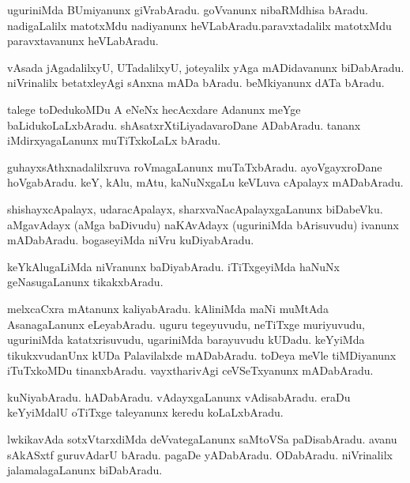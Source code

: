 \documentclass{article}
\begin{document}
\begin{mn}
uguriniMda BUmiyanunx giVrabAradu. goVvanunx nibaRMdhisa bAradu. nadigaLalilx matotxMdu 
nadiyanunx heVLabAradu.paravxtadalilx  matotxMdu paravxtavanunx heVLabAradu.
\end{mn}

\begin{mn}
vAsada jAgadalilxyU, UTadalilxyU, joteyalilx yAga mADidavanunx biDabAradu. niVrinalilx 
betatxleyAgi sAnxna mADa bAradu. beMkiyanunx dATa bAradu.
\end{mn}

\begin{mn}
talege toDedukoMDu A eNeNx hecAcxdare Adanunx meYge baLidukoLaLxbAradu. shAsatxrXtiLiyadavaroDane 
ADabAradu. tananx iMdirxyagaLanunx muTiTxkoLaLx bAradu.
\end{mn}

\begin{mn}
guhayxsAthxnadalilxruva roVmagaLanunx muTaTxbAradu. ayoVgayxroDane hoVgabAradu. keY, kAlu, mAtu, 
kaNuNxgaLu keVLuva cApalayx mADabAradu.
\end{mn}

\begin{mn}
shishayxcApalayx, udaracApalayx, sharxvaNacApalayxgaLanunx biDabeVku. aMgavAdayx (aMga baDivudu)
naKAvAdayx (uguriniMda bArisuvudu) ivanunx mADabAradu. bogaseyiMda niVru kuDiyabAradu.
\end{mn}

\begin{mn}
keYkAlugaLiMda niVranunx baDiyabAradu. iTiTxgeyiMda haNuNx geNasugaLanunx tikakxbAradu.
\end{mn}

\begin{mn}
melxcaCxra mAtanunx kaliyabAradu. kAliniMda maNi muMtAda AsanagaLanunx eLeyabAradu. uguru 
tegeyuvudu, neTiTxge muriyuvudu, uguriniMda katatxrisuvudu, ugariniMda barayuvudu kUDadu.
keYyiMda tikukxvudanUnx kUDa Palavilalxde mADabAradu. toDeya meVle tiMDiyanunx iTuTxkoMDu 
tinanxbAradu. vayxtharivAgi ceVSeTxyanunx mADabAradu.
\end{mn}

\begin{mn}
kuNiyabAradu. hADabAradu. vAdayxgaLanunx vAdisabAradu. eraDu keYyiMdalU oTiTxge taleyanunx keredu
koLaLxbAradu.
\end{mn}

\begin{mn}
lwkikavAda sotxVtarxdiMda deVvategaLanunx saMtoVSa paDisabAradu. avanu sAkASxtf guruvAdarU 
bAradu. pagaDe yADabAradu. ODabAradu. niVrinalilx jalamalagaLanunx biDabAradu.
\end{mn}
\end{document}

